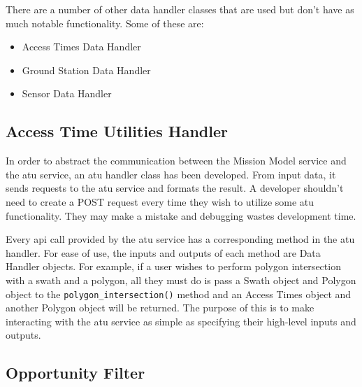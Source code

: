 There are a number of other data handler classes that are used but don't have
as much notable functionality. Some of these are:

\begin{itemize} 
    
    \item Access Times Data Handler
    \item Ground Station Data Handler
    \item Sensor Data Handler

\end{itemize}



\subsection{Access Time Utilities Handler}

In order to abstract the communication between the Mission Model service and
the \gls{atu} service, an \gls{atu} handler class has been developed. From
input data, it sends requests to the \gls{atu} service and formats the result.
A developer shouldn't need to create a POST request every time they wish to
utilize some \gls{atu} functionality. They may make a mistake and debugging
wastes development time. 

Every \gls{api} call provided by the \gls{atu} service has a corresponding
method in the \gls{atu} handler. For ease of use, the inputs and outputs of
each method are Data Handler objects. For example, if a user wishes to perform
polygon intersection with a swath and a polygon, all they must do is pass a
Swath object and Polygon object to the \texttt{polygon\_intersection()} method
and an Access Times object and another Polygon object will be returned. The
purpose of this is to make interacting with the \gls{atu} service as simple as
specifying their high-level inputs and outputs.


\subsection{Opportunity Filter}

